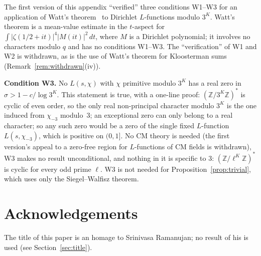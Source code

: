 \documentclass[12pt]{amsart}
\theoremstyle{plain}
\theoremstyle{definition}
\theoremstyle{remark}
\newcommand{\Z}{\mathbb{Z}}
\begin{document}
The first version of this appendix ``verified'' three conditions W1--W3 for an
application of Watt's theorem~\cite{Watt1995} to Dirichlet $L$-functions
modulo $3^K$. Watt's theorem is a mean-value estimate in the $t$-aspect for
$\int |\zeta(1/2+it)|^4 |M(it)|^2\,dt$, where $M$ is a Dirichlet polynomial; it
involves no characters modulo $q$ and has no conditions W1--W3. The
``verification'' of W1 and W2 is withdrawn, as is the use of Watt's theorem for
Kloosterman sums (Remark~\ref{rem:withdrawn}(iv)).

\textbf{Condition W3.} No $L(s,\chi)$ with $\chi$ primitive modulo $3^K$ has a
real zero in $\sigma > 1 - c/\log 3^K$. This statement is true, with a one-line
proof: $(\Z/3^K\Z)^*$ is cyclic of even order, so the only real non-principal
character modulo $3^K$ is the one induced from $\chi_{-3}$ modulo~$3$; an
exceptional zero can only belong to a real character; so any such zero would be
a zero of the single fixed $L$-function $L(s,\chi_{-3})$, which is positive on
$(0,1]$. No CM theory is needed (the first version's appeal to a zero-free region
for $L$-functions of CM fields is withdrawn), W3 makes no result unconditional,
and nothing in it is specific to $3$: $(\Z/\ell^K\Z)^*$ is cyclic for every odd
prime $\ell$. W3 is not needed for Proposition~\ref{prop:trivial}, which uses
only the Siegel--Walfisz theorem.

\section*{Acknowledgements}

The title of this paper is an homage to Srinivasa Ramanujan; no result of his is
used (see Section~\ref{sec:title}).
\end{document}
